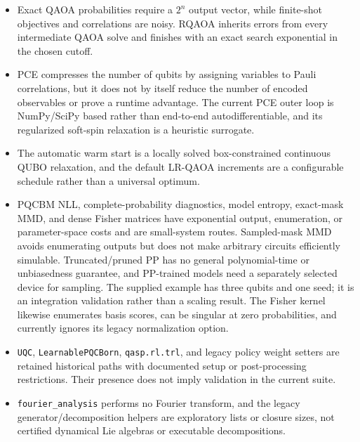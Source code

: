 \documentclass[10pt]{article}
\newcommand{\code}[1]{\texttt{#1}}
\begin{document}
\begin{itemize}
        the module does not guarantee an optimum or a better approximation
        ratio than a classical method.  \code{QUBO.brute\_force} is an
        exponential small-instance reference, not a scalable baseline.
  \item Exact QAOA probabilities require a $2^n$ output vector, while
        finite-shot objectives and correlations are noisy.  RQAOA inherits
        errors from every intermediate QAOA solve and finishes with an exact
        search exponential in the chosen cutoff.
  \item PCE compresses the number of qubits by assigning variables to Pauli
        correlations, but it does not by itself reduce the number of encoded
        observables or prove a runtime advantage.  The current PCE outer loop
        is NumPy/SciPy based rather than end-to-end autodifferentiable, and its
        regularized soft-spin relaxation is a heuristic surrogate.
  \item The automatic warm start is a locally solved box-constrained
        continuous QUBO relaxation, and the default LR-QAOA increments are a
        configurable schedule rather than a universal optimum.
  \item PQCBM NLL, complete-probability diagnostics, model entropy, exact-mask
        MMD, and dense Fisher matrices have exponential output, enumeration, or
        parameter-space costs and are small-system routes.  Sampled-mask MMD
        avoids enumerating outputs but does not make arbitrary circuits
        efficiently simulable.  Truncated/pruned PP has no general
        polynomial-time or unbiasedness guarantee, and PP-trained models need
        a separately selected device for sampling.  The supplied example has
        three qubits and one seed; it is an integration validation rather than
        a scaling result.  The Fisher kernel likewise enumerates basis scores,
        can be singular at zero probabilities, and currently ignores its
        legacy normalization option.
  \item \code{UQC}, \code{LearnablePQCBorn}, \code{qasp.rl.trl}, and legacy
        policy weight setters are retained historical paths with documented
        setup or post-processing restrictions.  Their presence does not imply
        validation in the current suite.
  \item \code{fourier\_analysis} performs no Fourier transform, and the legacy
        generator/decomposition helpers are exploratory lists or closure sizes,
        not certified dynamical Lie algebras or executable decompositions.

\end{itemize}
\end{document}
